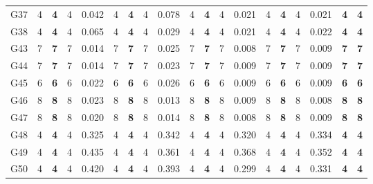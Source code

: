 \documentclass[12pt, a4paper]{article}%
\numberwithin{equation}{section}
\theoremstyle{plain}
\begin{document}
{\begin{landscape}
\begin{longtable}{lllllllllllllllllll}
						G37                       & 4    & \textbf{4}  & 4   & 0.042 & 4    & \textbf{4}  & 4   & 0.078 & 4    & \textbf{4}  & 4   & 0.021 & 4    & \textbf{4}  & 4   & 0.021 & \textbf{4}              & \textbf{4}           \\
						G38                       & 4    & \textbf{4}  & 4   & 0.065 & 4    & \textbf{4}  & 4   & 0.029 & 4    & \textbf{4}  & 4   & 0.021 & 4    & \textbf{4}  & 4   & 0.022 & \textbf{4}              & \textbf{4}           \\
						G43                       & 7    & \textbf{7}  & 7   & 0.014 & 7    & \textbf{7}  & 7   & 0.025 & 7    & \textbf{7}  & 7   & 0.008 & 7    & \textbf{7}  & 7   & 0.009 & \textbf{7}              & \textbf{7}           \\
						G44                       & 7    & \textbf{7}  & 7   & 0.014 & 7    & \textbf{7}  & 7   & 0.023 & 7    & \textbf{7}  & 7   & 0.009 & 7    & \textbf{7}  & 7   & 0.009 & \textbf{7}              & \textbf{7}           \\
						G45                       & 6    & \textbf{6}  & 6   & 0.022 & 6    & \textbf{6}  & 6   & 0.026 & 6    & \textbf{6}  & 6   & 0.009 & 6    & \textbf{6}  & 6   & 0.009 & \textbf{6}              & \textbf{6}           \\
						G46                       & 8    & \textbf{8}  & 8   & 0.023 & 8    & \textbf{8}  & 8   & 0.013 & 8    & \textbf{8}  & 8   & 0.009 & 8    & \textbf{8}  & 8   & 0.008 & \textbf{8}              & \textbf{8}           \\
						G47                       & 8    & \textbf{8}  & 8   & 0.020 & 8    & \textbf{8}  & 8   & 0.014 & 8    & \textbf{8}  & 8   & 0.008 & 8    & \textbf{8}  & 8   & 0.009 & \textbf{8}              & \textbf{8}           \\
						G48                       & 4    & \textbf{4}  & 4   & 0.325 & 4    & \textbf{4}  & 4   & 0.342 & 4    & \textbf{4}  & 4   & 0.320 & 4    & \textbf{4}  & 4   & 0.334 & \textbf{4}              & \textbf{4}           \\
						G49                       & 4    & \textbf{4}  & 4   & 0.435 & 4    & \textbf{4}  & 4   & 0.361 & 4    & \textbf{4}  & 4   & 0.368 & 4    & \textbf{4}  & 4   & 0.352 & \textbf{4}              & \textbf{4}           \\
						G50                       & 4    & \textbf{4}  & 4   & 0.420 & 4    & \textbf{4}  & 4   & 0.393 & 4    & \textbf{4}  & 4   & 0.299 & 4    & \textbf{4}  & 4   & 0.331 & \textbf{4}              & \textbf{4}           \\

\end{longtable}
\end{landscape}}
\end{document}
